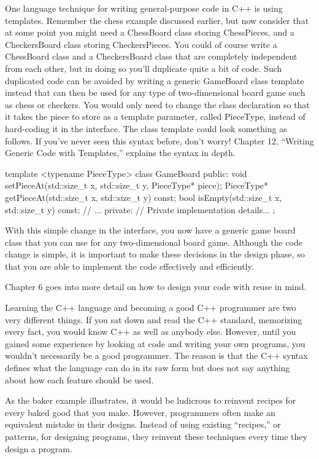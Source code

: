 One language technique for writing general-purpose code in C++ is using templates. Remember the chess example discussed earlier, but now consider that at some point you might need a ChessBoard class storing ChessPieces, and a CheckersBoard class storing CheckersPieces. You could of course write a ChessBoard class and a CheckersBoard class that are completely independent from each other, but in doing so you’ll duplicate quite a bit of code. Such duplicated code can be avoided by writing a generic GameBoard class template instead that can then be used for any type of two-dimensional board game such as chess or checkers. You would only need to change the class declaration so that it takes the piece to store as a template parameter, called PieceType, instead of hard-coding it in the interface. The class template could look something as follows. If you’ve never seen this syntax before, don’t worry! Chapter 12, “Writing Generic Code with Templates,” explains the syntax in depth.

\begin{cpp}
template <typename PieceType>
class GameBoard
{
    public:
        void setPieceAt(std::size_t x, std::size_t y, PieceType* piece);
        PieceType* getPieceAt(std::size_t x, std::size_t y) const;
        bool isEmpty(std::size_t x, std::size_t y) const;
        // ...
    private:
        // Private implementation details...
};
\end{cpp}

With this simple change in the interface, you now have a generic game board class that you can use for any two-dimensional board game. Although the code change is simple, it is important to make these decisions in the design phase, so that you are able to implement the code effectively and efficiently.

Chapter 6 goes into more detail on how to design your code with reuse in mind.


Learning the C++ language and becoming a good C++ programmer are two very different things. If you sat down and read the C++ standard, memorizing every fact, you would know C++ as well as anybody else. However, until you gained some experience by looking at code and writing your own programs, you wouldn’t necessarily be a good programmer. The reason is that the C++ syntax defines what the language can do in its raw form but does not say anything about how each feature should be used.

As the baker example illustrates, it would be ludicrous to reinvent recipes for every baked good that you make. However, programmers often make an equivalent mistake in their designs. Instead of using existing “recipes,” or patterns, for designing programs, they reinvent these techniques every time they design a program.

